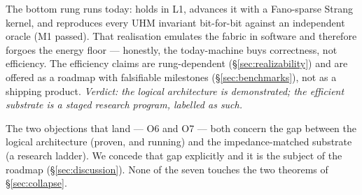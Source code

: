 \begin{redteambox}
The bottom rung runs today: \SYNARC{} holds \DM{} in L1, advances it with a
Fano-sparse Strang kernel, and reproduces every UHM invariant bit-for-bit
against an independent oracle (M1 passed). That realisation emulates the
fabric in software and therefore forgoes the energy floor --- honestly, the
today-machine buys correctness, not efficiency. The efficiency claims are
rung-dependent (\S\ref{sec:realizability}) and are offered as a roadmap with
falsifiable milestones (\S\ref{sec:benchmarks}), not as a shipping product.
\emph{Verdict: the logical architecture is demonstrated; the efficient
substrate is a staged research program, labelled as such.}
\end{redteambox}

\noindent The two objections that land --- O6 and O7 --- both concern the gap
between the logical architecture (proven, and running) and the
impedance-matched substrate (a research ladder). We concede that gap
explicitly and it is the subject of the roadmap (\S\ref{sec:discussion}).
None of the seven touches the two theorems of \S\ref{sec:collapse}.

